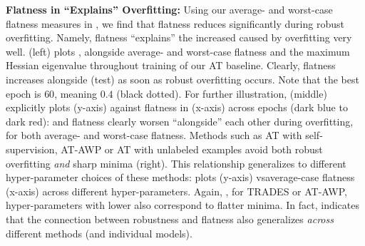 \textbf{Flatness in \RCE ``Explains'' Overfitting:}
%
Using our average- and worst-case flatness measures in \RCE, we find that flatness reduces significantly during robust overfitting. Namely, flatness ``explains'' the increased \RCE caused by overfitting very well.  (left) plots \RCE, alongside average- and worst-case flatness and the maximum Hessian eigenvalue throughout training of our AT baseline. Clearly, flatness increases alongside (test) \RCE as soon as robust overfitting occurs. Note that the best epoch is $60$, meaning $0.4$ (black dotted). For further illustration,  (middle) explicitly plots \RCE (y-axis) against flatness in \RCE (x-axis) across epochs ({\color{blue!50!black}dark blue} to {\color{red!50!black}dark red}): \RCE and flatness clearly worsen ``alongside'' each other during overfitting, for both average- and worst-case flatness. Methods such as AT with self-supervision, AT-AWP or AT with unlabeled examples avoid both robust overfitting \emph{and} sharp minima (right).
This relationship generalizes to different hyper-parameter choices of these methods:  plots \RCE (y-axis) vs\onedot average-case flatness (x-axis) across different hyper-parameters. Again, \eg, for {\color{plot9}TRADES} or {\color{plot10!80!black}AT-AWP}, hyper-parameters with lower \RCE also correspond to flatter minima.
In fact,  indicates that the connection between robustness and flatness also generalizes \emph{across} different methods (and individual models).

